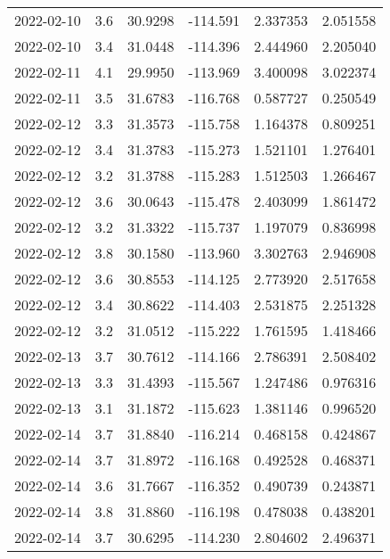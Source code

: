 \begin{tabular}{lrrrrr}
2022-02-10 &       3.6 &  30.9298 &  -114.591 &         2.337353 &         2.051558 \\
2022-02-10 &       3.4 &  31.0448 &  -114.396 &         2.444960 &         2.205040 \\
2022-02-11 &       4.1 &  29.9950 &  -113.969 &         3.400098 &         3.022374 \\
2022-02-11 &       3.5 &  31.6783 &  -116.768 &         0.587727 &         0.250549 \\
2022-02-12 &       3.3 &  31.3573 &  -115.758 &         1.164378 &         0.809251 \\
2022-02-12 &       3.4 &  31.3783 &  -115.273 &         1.521101 &         1.276401 \\
2022-02-12 &       3.2 &  31.3788 &  -115.283 &         1.512503 &         1.266467 \\
2022-02-12 &       3.6 &  30.0643 &  -115.478 &         2.403099 &         1.861472 \\
2022-02-12 &       3.2 &  31.3322 &  -115.737 &         1.197079 &         0.836998 \\
2022-02-12 &       3.8 &  30.1580 &  -113.960 &         3.302763 &         2.946908 \\
2022-02-12 &       3.6 &  30.8553 &  -114.125 &         2.773920 &         2.517658 \\
2022-02-12 &       3.4 &  30.8622 &  -114.403 &         2.531875 &         2.251328 \\
2022-02-12 &       3.2 &  31.0512 &  -115.222 &         1.761595 &         1.418466 \\
2022-02-13 &       3.7 &  30.7612 &  -114.166 &         2.786391 &         2.508402 \\
2022-02-13 &       3.3 &  31.4393 &  -115.567 &         1.247486 &         0.976316 \\
2022-02-13 &       3.1 &  31.1872 &  -115.623 &         1.381146 &         0.996520 \\
2022-02-14 &       3.7 &  31.8840 &  -116.214 &         0.468158 &         0.424867 \\
2022-02-14 &       3.7 &  31.8972 &  -116.168 &         0.492528 &         0.468371 \\
2022-02-14 &       3.6 &  31.7667 &  -116.352 &         0.490739 &         0.243871 \\
2022-02-14 &       3.8 &  31.8860 &  -116.198 &         0.478038 &         0.438201 \\
2022-02-14 &       3.7 &  30.6295 &  -114.230 &         2.804602 &         2.496371 \\

\end{tabular}
